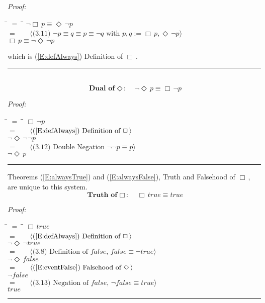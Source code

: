 \documentclass[fleqn, leqno]{article}
\newcommand{\lgap}{2pt}                             %
\newcommand{\mymathindent}{24pt}                    %
\newcommand{\Event}{\Diamond\,}
\newcommand{\Always}{\Box\,}
\newcommand{\myqed}{\rule[-.23ex]{1.2ex}{2.0ex}}
\newcommand{\myqedtab}{\hspace{388.5pt}}              %
\newcommand{\Gll} {\langle}                         %
\newcommand{\Ggg} {\rangle}                         %
\newcommand{\Hint}[1]     {\ \ \ $\Gll              \mbox{#1} \Ggg$ }   %
\begin{document}
\emph{Proof:}
\begin{tabbing}
\hspace{\mymathindent} \= $= \;$ \= \myqedtab \= \kill
  \> \>   $\neg\Always p \equiv \Event\neg p$\\[\lgap]
  \> $=$  \>  \Hint{(3.11) $\neg p \equiv q \equiv p \equiv \neg q$ with $p,q := \Always p, \Event\neg p$}\\[\lgap]
  \> \>   $\Always p \equiv \neg\Event\neg p$
\end{tabbing}
which is (\ref{E:defAlways}) Definition of $\Always$. \hfill \myqed\\[\lgap]

\begin{equation}\label{E:dualEvent}
\textbf{Dual of $\Event$:}\quad \neg\Event p \equiv \Always\neg p
\end{equation}

\emph{Proof:}
\begin{tabbing}
\hspace{\mymathindent} \= $= \;$ \= \myqedtab \= \kill
  \> \>   $\Always\neg p$\\[\lgap]
  \> $=$  \>  \Hint{(\ref{E:defAlways}) Definition of $\Always$}\\[\lgap]
  \> \>   $\neg\Event\neg\neg p$\\[\lgap]
  \> $=$  \>  \Hint{(3.12) Double Negation $\neg\neg p\equiv p$}\\[\lgap]
  \> \>   $\neg\Event p$ \> \myqed
\end{tabbing}

Theorems (\ref{E:alwaysTrue}) and (\ref{E:alwaysFalse}), Truth and Falsehood of $\Always$, are unique to this system.
\begin{equation}\label{E:alwaysTrue}
\textbf{Truth of $\Always$:}\quad \Always true \equiv true
\end{equation}

\emph{Proof:}
\begin{tabbing}
\hspace{\mymathindent} \= $= \;$ \= \myqedtab \= \kill
  \> \>   $\Always true$\\[\lgap]
  \> $=$  \>  \Hint{(\ref{E:defAlways}) Definition of $\Always$}\\[\lgap]
  \> \>   $\neg\Event\neg true$\\[\lgap]
  \> $=$  \>  \Hint{(3.8) Definition of $false$, $false\equiv \neg true$}\\[\lgap]
  \> \>   $\neg\Event false$\\[\lgap]
  \> $=$  \>  \Hint{(\ref{E:eventFalse}) Falsehood of $\Event$}\\[\lgap]
  \> \>   $\neg false$\\[\lgap]
  \> $=$  \>  \Hint{(3.13) Negation of $false$, $\neg false\equiv true$}\\[\lgap]
  \> \>   $true$ \> \myqed
\end{tabbing}
\end{document}
